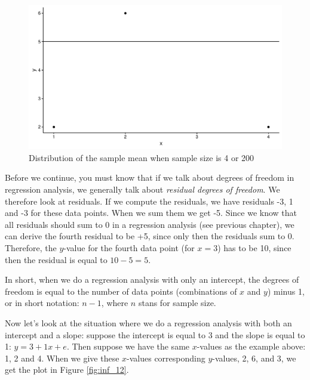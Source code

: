 \documentclass[]{book}\usepackage[]{graphicx}\usepackage[]{color}
\makeatletter
\def\maxwidth{ %
  \ifdim\Gin@nat@width>\linewidth
    \linewidth
  \else
    \Gin@nat@width
  \fi
}
\newenvironment{knitrout}{}{} %
\makeatother
\begin{document}
\begin{knitrout}
\color{fgcolor}\begin{figure}

{\centering \includegraphics[width=\maxwidth]{figure/inf_11-1} 

}

\caption[Distribution of the sample mean when sample size is 4 or 200]{Distribution of the sample mean when sample size is 4 or 200}\label{fig:inf_11}
\end{figure}


\end{knitrout}

Before we continue, you must know that if we talk about degrees of freedom in regression analysis, we generally talk about \textit{residual degrees of freedom}. We therefore look at residuals. If we compute the residuals, we have residuals -3, 1 and -3 for these data points. When we sum them we get -5. Since we know that all residuals should sum to 0 in a regression analysis (see previous chapter), we can derive the fourth residual to be +5, since only then the residuals sum to 0. Therefore, the $y$-value for the fourth data point (for $x=3$) has to be 10, since then the residual is equal to $10-5=5$.

In short, when we do a regression analysis with only an intercept, the degrees of freedom is equal to the number of data points (combinations of $x$ and $y$) minus 1, or in short notation: $n-1$, where $n$ stans for sample size.

Now let's look at the situation where we do a regression analysis with both an intercept and a slope: suppose the intercept is equal to 3 and the slope is equal to 1: $y=3+1 x+e$. Then suppose we have the same $x$-values as the example above: 1, 2 and 4. When we give these $x$-values corresponding $y$-values, 2, 6, and 3, we get the plot in Figure \ref{fig:inf_12}.
\end{document}
